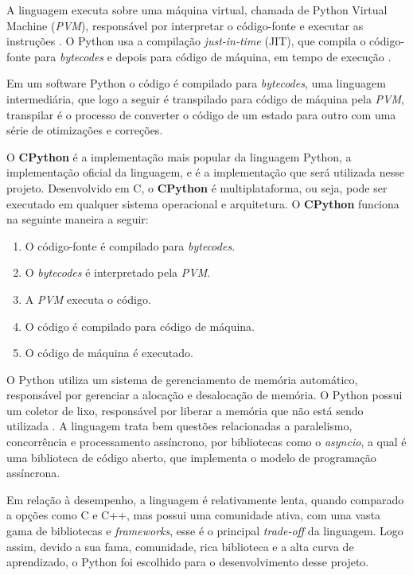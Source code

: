     A linguagem executa sobre uma máquina virtual, chamada de Python Virtual Machine (\textit{PVM}), responsável por interpretar o código-fonte e executar as instruções \cite{pvm-2017}. O Python usa a compilação \textit{just-in-time} (JIT), que compila o código-fonte para \textit{bytecodes} e depois para código de máquina, em tempo de execução \cite{pvm-2017}.

    Em um software Python o código é compilado para \textit{bytecodes}, uma linguagem intermediária, que logo a seguir é transpilado para código de máquina pela \textit{PVM}, transpilar é o processo de converter o código de um estado para outro com uma série de otimizações e correções.

    O \textbf{CPython} é a implementação mais popular da linguagem Python, a implementação oficial da linguagem, e é a implementação que será utilizada nesse projeto. Desenvolvido em C, o \textbf{CPython} é multiplataforma, ou seja, pode ser executado em qualquer sistema operacional e arquitetura. O \textbf{CPython} funciona na seguinte maneira a seguir:

    \begin{enumerate}
        \item O código-fonte é compilado para \textit{bytecodes}.
        \item O \textit{bytecodes} é interpretado pela \textit{PVM}.
        \item A \textit{PVM} executa o código.
        \item O código é compilado para código de máquina.
        \item O código de máquina é executado.
    \end{enumerate}

    O Python utiliza um sistema de gerenciamento de memória automático, responsável por gerenciar a alocação e desalocação de memória. O Python possui um coletor de lixo, responsável por liberar a memória que não está sendo utilizada \cite{pvm-2017}. A linguagem trata bem questões relacionadas a paralelismo, concorrência e processamento assíncrono, por bibliotecas como o \textit{asyncio}, a qual é uma biblioteca de código aberto, que implementa o modelo de programação assíncrona.

    Em relação à desempenho, a linguagem é relativamente lenta, quando comparado a opções como C e C++, mas possui uma comunidade ativa, com uma vasta gama de bibliotecas e \textit{frameworks}, esse é o principal \textit{trade-off} da linguagem. Logo assim, devido a sua fama, comunidade, rica biblioteca e a alta curva de aprendizado, o Python foi escolhido para o desenvolvimento desse projeto.

